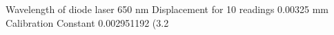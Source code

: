 Wavelength of diode laser	650	nm
Displacement for 10 readings	0.00325	mm
Calibration Constant		0.002951192	(3.2%

